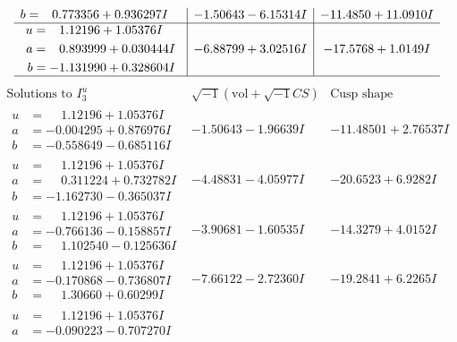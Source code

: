 \documentclass[1p]{elsarticle_modified}
\theoremstyle{definition}
\newcommand{\I}{\sqrt{-1}}
\begin{document}
$$\begin{array}{c|c|c}
\begin{aligned}
b &= \phantom{-}0.773356 + 0.936297 I\end{aligned}
 & -1.50643 - 6.15314 I & -11.4850 + 11.0910 I \\ \hline\begin{aligned}
u &= \phantom{-}1.12196 + 1.05376 I \\
a &= \phantom{-}0.893999 + 0.030444 I \\
b &= -1.131990 + 0.328604 I\end{aligned}
 & -6.88799 + 3.02516 I & -17.5768 + 1.0149 I\\
 \hline 
 \end{array}$$\newpage$$\begin{array}{c|c|c}  
\text{Solutions to }I^u_{3}& \I (\text{vol} + \sqrt{-1}CS) & \text{Cusp shape}\\
 \hline 
\begin{aligned}
u &= \phantom{-}1.12196 + 1.05376 I \\
a &= -0.004295 + 0.876976 I \\
b &= -0.558649 - 0.685116 I\end{aligned}
 & -1.50643 - 1.96639 I & -11.48501 + 2.76537 I \\ \hline\begin{aligned}
u &= \phantom{-}1.12196 + 1.05376 I \\
a &= \phantom{-}0.311224 + 0.732782 I \\
b &= -1.162730 - 0.365037 I\end{aligned}
 & -4.48831 - 4.05977 I & -20.6523 + 6.9282 I \\ \hline\begin{aligned}
u &= \phantom{-}1.12196 + 1.05376 I \\
a &= -0.766136 - 0.158857 I \\
b &= \phantom{-}1.102540 - 0.125636 I\end{aligned}
 & -3.90681 - 1.60535 I & -14.3279 + 4.0152 I \\ \hline\begin{aligned}
u &= \phantom{-}1.12196 + 1.05376 I \\
a &= -0.170868 - 0.736807 I \\
b &= \phantom{-}1.30660 + 0.60299 I\end{aligned}
 & -7.66122 - 2.72360 I & -19.2841 + 6.2265 I \\ \hline\begin{aligned}
u &= \phantom{-}1.12196 + 1.05376 I \\
a &= -0.090223 - 0.707270 I \\

\end{aligned}
\end{array}$$
\end{document}
